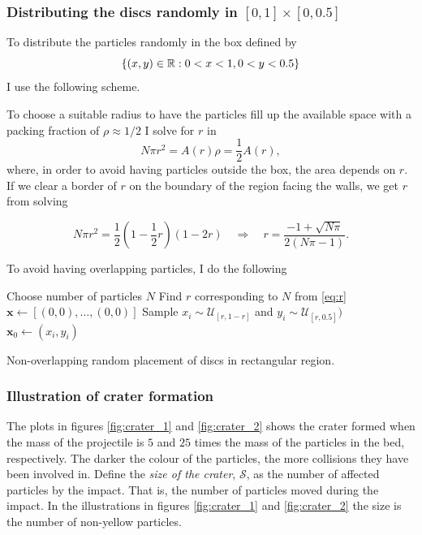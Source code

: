 \subsubsection{Distributing the discs randomly in $[0,1]\times[0,0.5]$}

To distribute the particles randomly in the box defined by 
$$
\{(x,y)\in \mathbb{R} : 0 < x < 1, 0 < y < 0.5\}
$$ 
I use the following scheme. 

To choose a suitable radius to have the particles fill up the available space with a packing fraction of $\rho \approx 1/2$ I solve for $r$ in 
$$
	N \pi r^2 = A(r) \rho = \frac{1}{2} A(r),  
$$
where, in order to avoid having particles outside the box, the area depends on $r$. If we clear a border of $r$ on the boundary of the region facing the walls, we get $r$ from solving

\begin{equation}\label{eq:r}
	N \pi r^2 = \frac{1}{2} \left(1- \frac{1}{2}r\right) \left(1-2r\right) \quad \Rightarrow \quad r = \frac{-1 + \sqrt{N\pi}}{2(N\pi - 1)}.
\end{equation}

To avoid having overlapping particles, I do the following

\begin{algorithm}[H]
	Choose number of particles $N$\;
	Find $r$ corresponding to $N$ from \eqref{eq:r}\;
	$\mathbf{x} \gets [(0,0),\dots,(0,0)]$\;
	Sample $x_i \sim \mathcal{U}_{[r,1-r]}$ and $y_i \sim \mathcal{U}_{[r,0.5]})$\;
	$\mathbf{x}_0 \gets (x_i,y_i)$\;
	\caption{Non-overlapping random placement of discs in rectangular region.}
\end{algorithm}  

\subsubsection{Illustration of crater formation}

The plots in figures \ref{fig:crater_1} and \ref{fig:crater_2} shows the crater formed when the mass of the projectile is $5$ and $25$ times the mass of the particles in the bed, respectively. The darker the colour of the particles, the more collisions they have been involved in. Define the \textit{size of the crater}, $\mathcal{S}$, as the number of affected particles by the impact. That is, the number of particles moved during the impact. In the illustrations in figures \ref{fig:crater_1} and \ref{fig:crater_2} the size is the number of non-yellow particles. 

